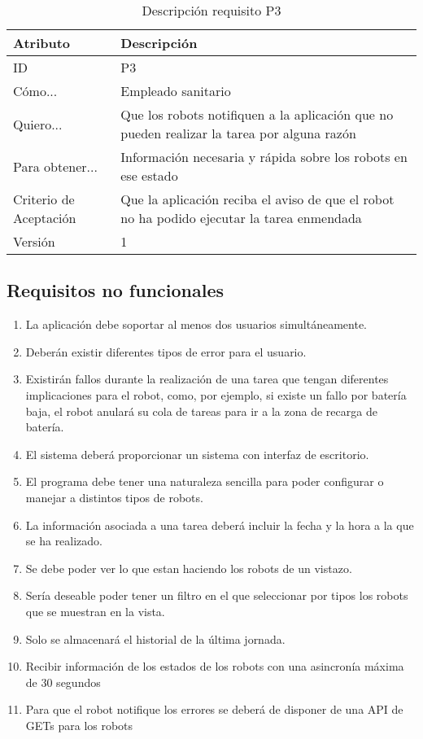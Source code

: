 \begin{table}[H]
    \label{tab:reqF2}
 	\caption{Descripción requisito P3}
	\centering

	\begin{tabular}{C{3cm}|C{12cm}}
 		\toprule
 		\textbf{Atributo} & \textbf{Descripción} \\
 		\midrule
 	    ID & P3 \\
 	    Cómo... & Empleado sanitario \\
 	    Quiero... & Que los robots notifiquen a la aplicación que no pueden realizar la tarea por alguna razón \\
 	    Para obtener... & Información necesaria y rápida sobre los robots en ese estado  \\
 	    Criterio de Aceptación & Que la aplicación reciba el aviso de que el robot no ha podido ejecutar la tarea enmendada \\
 	    Versión & 1 \\
 		\bottomrule
 		\end{tabular}
\end{table}
\subsection{Requisitos no funcionales}

\begin{enumerate}
  \item La aplicación debe soportar al menos dos usuarios simultáneamente.
  \item Deberán existir diferentes tipos de error para el usuario.
  \item Existirán fallos durante la realización de una tarea que tengan diferentes implicaciones para el robot, como, por ejemplo, si existe un fallo por batería baja, el robot anulará su cola de tareas para ir a la zona de recarga de batería.
  \item El sistema deberá proporcionar un sistema con interfaz de escritorio. 
  \item El programa debe tener una naturaleza sencilla para poder configurar o manejar a distintos tipos de robots.
  \item La información asociada a una tarea deberá incluir la fecha y la hora a la que se ha realizado.
  \item Se debe poder ver lo que estan haciendo los robots de un vistazo.
  \item Sería deseable poder tener un filtro en el que seleccionar por tipos los robots que se muestran en la vista.
  \item Solo se almacenará el historial de la última jornada.
  \item Recibir información de los estados de los robots con una asincronía máxima de 30 segundos
  \item Para que el robot notifique los errores se deberá de disponer de una API de GETs para los robots

\end{enumerate}